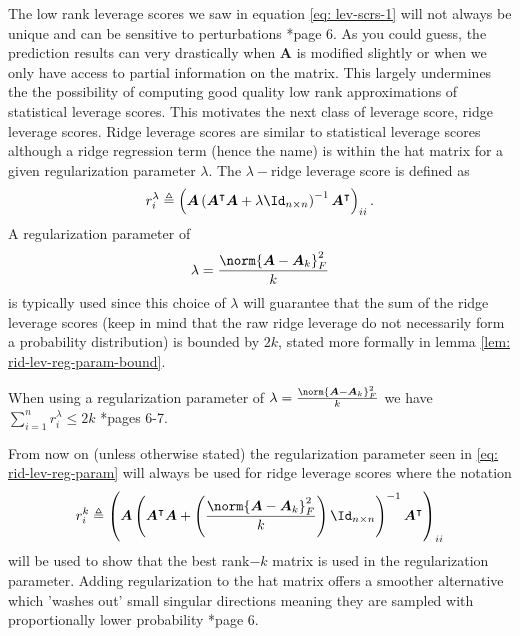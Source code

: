 The low rank leverage scores we saw in equation \ref{eq: lev-scrs-1} will not always be unique and can be sensitive to perturbations \cite{DBLP:journals/corr/CohenMM15}*{page 6}. As you could guess, the prediction results can very drastically when $\bm{A}$ is modified slightly or when we only have access to partial information on the matrix. This largely undermines the the possibility of computing good quality low rank approximations of statistical leverage scores. This motivates the next class of leverage score, ridge leverage scores. Ridge leverage scores are similar to statistical leverage scores although a ridge regression term (hence the name) is within the hat matrix for a given regularization parameter $\lambda$. The $\lambda-$ridge leverage score is defined as
\begin{equation*}
    r_{i}^{\lambda} \triangleq \left( \bm{A} \left( \bm{A}^{\intercal} \bm{A} + \lambda \Id_{n \times n} \right)^{-1} \bm{A}^{\intercal} \right)_{ii}.
\end{equation*}
A regularization parameter of
\begin{equation*} \label{eq: rid-lev-reg-param}
    \lambda = \frac{\norm{\bm{A} - \bm{A}_k}_F^{2}}{k}
\end{equation*}
is typically used since this choice of $\lambda$ will guarantee that the sum of the ridge leverage scores (keep in mind that the raw ridge leverage do not necessarily form a probability distribution) is bounded by $2k$, stated more formally in lemma \ref{lem: rid-lev-reg-param-bound}.
\begin{lem} \label{lem: rid-lev-reg-param-bound}
    When using a regularization parameter of $\lambda = \frac{\norm{\bm{A} - \bm{A}_k}_F^{2}}{k}$ we have $\sum_{i=1}^{n} r_{i}^{\lambda} \leq 2k$ \cite{DBLP:journals/corr/CohenMM15}*{pages 6-7}.
\end{lem}
From now on (unless otherwise stated) the regularization parameter seen in \ref{eq: rid-lev-reg-param} will always be used for ridge leverage scores where the notation
\begin{equation*}
    r_{i}^{k} \triangleq \left( \bm{A} \left( \bm{A}^{\intercal} \bm{A} + \left( \frac{\norm{\bm{A} - \bm{A}_k}_F^{2}}{k} \right) \Id_{n \times n} \right)^{-1} \bm{A}^{\intercal} \right)_{ii}
\end{equation*}
will be used to show that the best rank$-k$ matrix is used in the regularization parameter. Adding regularization to the hat matrix offers a smoother alternative which 'washes out' small singular directions meaning they are sampled with proportionally lower probability \cite{DBLP:journals/corr/CohenMM15}*{page 6}.